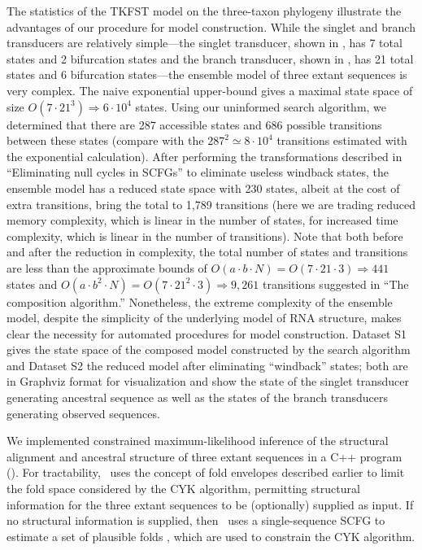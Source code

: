 \documentclass[10pt]{article}
\begin{document}
The statistics of the TKFST model on the three-taxon phylogeny
illustrate the advantages of our procedure for model construction.
While the singlet and branch transducers are relatively simple---the
singlet transducer, shown in , has 7 total states
and 2 bifurcation states and the branch transducer, shown in
, has 21 total states and 6 bifurcation
states---the ensemble model of three extant sequences is very complex.
The naive exponential upper-bound gives a maximal state space of size
$O(7 \cdot 21^{3}) \Rightarrow 6 \cdot 10^4$ states.  Using our
uninformed search algorithm, we determined that there are 287
accessible states and 686 possible transitions between these states
(compare with the $287^2 \simeq 8 \cdot 10^4$ transitions estimated
with the exponential calculation).  After performing the
transformations described in ``Eliminating null cycles in SCFGs'' to
eliminate useless windback states, the ensemble model has a reduced
state space with 230 states, albeit at the cost of extra transitions,
bring the total to 1,789 transitions (here we are trading reduced
memory complexity, which is linear in the number of states, for
increased time complexity, which is linear in the number of
transitions).  Note that both before and after the reduction in
complexity, the total number of states and transitions are less than
the approximate bounds of $O(a \cdot b \cdot N) = O(7 \cdot 21 \cdot
3) \Rightarrow 441$ states and $O(a \cdot b^2 \cdot N) = O(7 \cdot
21^2 \cdot 3) \Rightarrow 9,261$ transitions suggested in ``The
composition algorithm.''  Nonetheless, the extreme complexity of the
ensemble model, despite the simplicity of the underlying model of RNA
structure, makes clear the necessity for automated procedures for
model construction.  Dataset S1 gives the state space of the composed
model constructed by the search algorithm and Dataset S2 the reduced
model after eliminating ``windback'' states; both are in Graphviz format for
visualization and show the state of the singlet transducer generating
ancestral sequence as well as the states of the branch transducers
generating observed sequences.

We implemented constrained maximum-likelihood inference of the structural alignment 
and ancestral structure of three extant sequences in a C++ program (\indiegram).
For tractability, \indiegram\ uses the concept of fold envelopes
described earlier to limit the fold space considered by the CYK algorithm,
permitting structural information for the three extant sequences to be
(optionally) supplied as input.
If no structural information is supplied, then \indiegram\
uses a single-sequence SCFG to estimate a set of plausible folds \cite{Holmes2005},
which are used to constrain the CYK algorithm.
\end{document}
